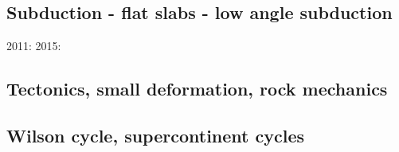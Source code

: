 \subsection*{Subduction - flat slabs - low angle subduction}

2011: \cite{cube11}
2015: \cite{gehm15}

\subsection*{Tectonics, small deformation, rock mechanics}

\cite{ilma93}
\cite{hept96}
\cite{lega12}

\subsection*{Wilson cycle, supercontinent cycles}

\cite{trry95}
\cite{zhzl07}
\cite{zhzm09}
\cite{begb19}




